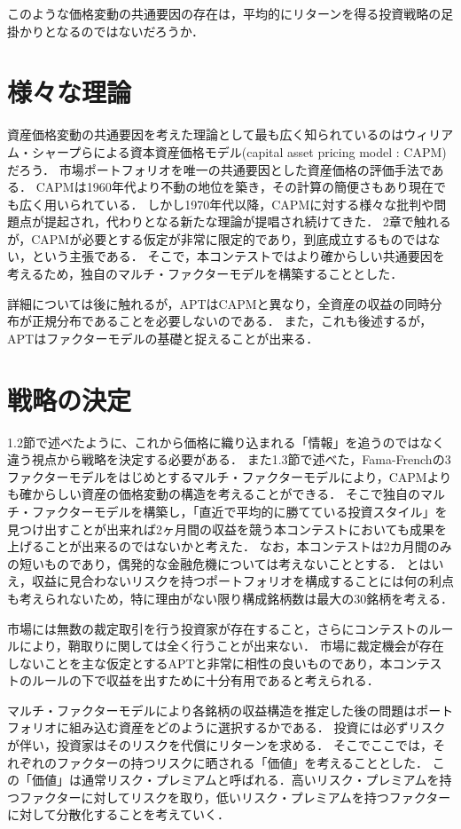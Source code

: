 \documentclass[11pt]{jreport}
\begin{document}
このような価格変動の共通要因の存在は，平均的にリターンを得る投資戦略の足掛かりとなるのではないだろうか．

\section{様々な理論}
資産価格変動の共通要因を考えた理論として最も広く知られているのはウィリアム・シャープらによる資本資産価格モデル(capital asset pricing model : CAPM)だろう．
市場ポートフォリオを唯一の共通要因とした資産価格の評価手法である．
CAPMは1960年代より不動の地位を築き，その計算の簡便さもあり現在でも広く用いられている．
しかし1970年代以降，CAPMに対する様々な批判や問題点が提起され，代わりとなる新たな理論が提唱され続けてきた．
2章で触れるが，CAPMが必要とする仮定が非常に限定的であり，到底成立するものではない，という主張である．
そこで，本コンテストではより確からしい共通要因を考えるため，独自のマルチ・ファクターモデルを構築することとした．

詳細については後に触れるが，APTはCAPMと異なり，全資産の収益の同時分布が正規分布であることを必要しないのである．
また，これも後述するが，APTはファクターモデルの基礎と捉えることが出来る．

\section{戦略の決定}
1.2節で述べたように、これから価格に織り込まれる「情報」を追うのではなく違う視点から戦略を決定する必要がある．
また1.3節で述べた，Fama-Frenchの3ファクターモデルをはじめとするマルチ・ファクターモデルにより，CAPMよりも確からしい資産の価格変動の構造を考えることができる．
そこで独自のマルチ・ファクターモデルを構築し，「直近で平均的に勝てている投資スタイル」を見つけ出すことが出来れば2ヶ月間の収益を競う本コンテストにおいても成果を上げることが出来るのではないかと考えた．
なお，本コンテストは2カ月間のみの短いものであり，偶発的な金融危機については考えないこととする．
とはいえ，収益に見合わないリスクを持つポートフォリオを構成することには何の利点も考えられないため，特に理由がない限り構成銘柄数は最大の30銘柄を考える．

市場には無数の裁定取引を行う投資家が存在すること，さらにコンテストのルールにより，鞘取りに関しては全く行うことが出来ない．
市場に裁定機会が存在しないことを主な仮定とするAPTと非常に相性の良いものであり，本コンテストのルールの下で収益を出すために十分有用であると考えられる．

マルチ・ファクターモデルにより各銘柄の収益構造を推定した後の問題はポートフォリオに組み込む資産をどのように選択するかである．
投資には必ずリスクが伴い，投資家はそのリスクを代償にリターンを求める．
そこでここでは，それぞれのファクターの持つリスクに晒される「価値」を考えることとした．
この「価値」は通常リスク・プレミアムと呼ばれる．高いリスク・プレミアムを持つファクターに対してリスクを取り，低いリスク・プレミアムを持つファクターに対して分散化することを考えていく．
\end{document}
